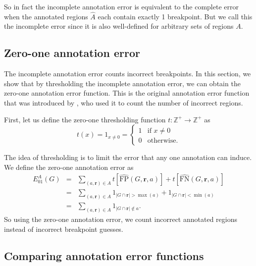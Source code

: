 \documentclass{article}
\renewcommand{\r}{ \mathbf{ r} }
\begin{document}
So in fact the incomplete annotation error is equivalent to the
complete error when the annotated regions $\hat A$ each contain
exactly 1 breakpoint. But we call this the incomplete error since it
is also well-defined for arbitrary sets of regions $A$.


\newpage

\subsection{Zero-one annotation error}
\label{sec:zero-one}

The incomplete annotation error counts incorrect breakpoints. In this
section, we show that by thresholding the incomplete annotation error,
we can obtain the zero-one annotation error function. This is the
original annotation error function that was introduced by
\citet{HOCKING-breakpoints}, who used it to count the number of
incorrect regions.

First, let us define the zero-one thresholding function
$t:\mathbb Z^+\rightarrow\mathbb Z^+$ as
\begin{equation}
  \label{eq:thresholding}
  t(x)=1_{x\neq 0} =
  \begin{cases}
    1 & \text{if }x\neq 0\\
    0 & \text{otherwise}.
  \end{cases}
\end{equation}

The idea of thresholding is to limit the error that any one annotation
can induce. We define the zero-one annotation error as
\begin{eqnarray}
  \label{eq:ann01err}
  E_{01}^{A}(G)
&=&\nonumber
 \sum_{(a, \r)\in A} 
t\left[\hat{\text{FP}}(G,\r,a)\right]+
t\left[\hat{\text{FN}}(G,\r,a)\right]\\
&=&\nonumber
 \sum_{(a, \r)\in A} 
1_{|G\cap\r|>\max(a)}+
1_{|G\cap \r|<\min(a)}\\
&=&
 \sum_{(a, \r)\in A} 
1_{|G\cap\r|\not\in a}.
\end{eqnarray}
So using the zero-one annotation error, we count incorrect annotated
regions instead of incorrect breakpoint guesses.  

\newpage

\subsection{Comparing annotation error functions}
\end{document}
